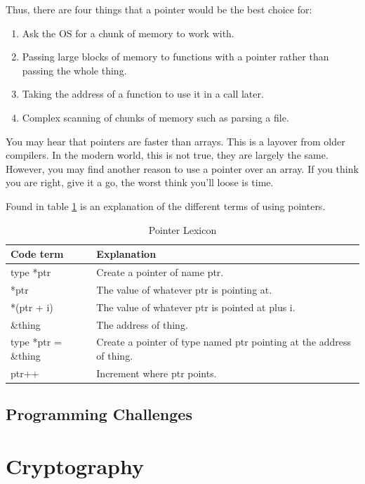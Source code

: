 \documentclass[a4paper,11pt]{report}
\begin{document}
			Thus, there are four things that a pointer would be the best choice for:
			\begin{enumerate}
				\item Ask the OS for a chunk of memory to work with. 
				\item Passing large blocks of memory to functions with a pointer rather than passing the whole thing. 
				\item Taking the address of a function to use it in a call later. 
				\item Complex scanning of chunks of memory such as parsing a file. 
			\end{enumerate}
			You may hear that pointers are faster than arrays. 
			This is a layover from older compilers. 
			In the modern world, this is not true, they are largely the same. 
			However, you may find another reason to use a pointer over an array. 
			If you think you are right, give it a go, the worst think you'll loose is time. 

			Found in table \ref{tab:PointerLexicon} is an explanation of the different terms of using pointers. 
			
			\begin{table}[htb]
				\centering
				\begin{tabular}{| l | p{8cm} |}
					\hline
					\textbf{Code term} & \textbf{Explanation} \\ \hline 
					type *ptr & Create a pointer of name ptr. \\ \hline
					*ptr & The value of whatever ptr is pointing at. \\ \hline
					*(ptr + i) & The value of whatever ptr is pointed at plus i. \\ \hline
					\&thing & The address of thing. \\ \hline
					type *ptr = \&thing & Create a pointer of type named ptr pointing at the address of thing. \\ \hline
					ptr++ & Increment where ptr points. \\ \hline
				\end{tabular}
				\caption{Pointer Lexicon}
				\label{tab:PointerLexicon}
			\end{table}
	\section{Programming Challenges}
\chapter{Cryptography}
	\label{ch:Cryptography}
\end{document}
